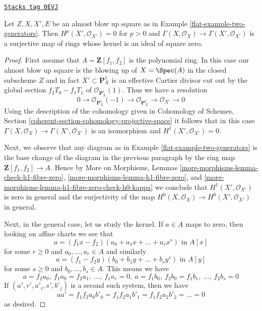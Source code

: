 \begin{lemma}
\label{flat-lemma-funny-blow-up}
\href{https://stacks.math.columbia.edu/tag/0EVJ}{\texttt{Stacks tag 0EVJ}}

Let $Z, X, X', E$ be an almost blow up square as in
Example \ref{flat-example-two-generators}.
Then $H^p(X', \mathcal{O}_{X'}) = 0$ for $p > 0$ and
$\Gamma(X, \mathcal{O}_X) \to \Gamma(X', \mathcal{O}_{X'})$
is a surjective map of rings whose kernel is an ideal of square zero.
\end{lemma}

\begin{proof}

First assume that $A = \mathbf{Z}[f_1, f_2]$ is the polynomial ring.
In this case our almost blow up square is the blowing up of $X = \Spec(A)$
in the closed subscheme $Z$ and in fact $X' \subset \mathbf{P}^1_X$
is an effective Cartier divisor cut out by the global section
$f_2T_0 - f_1 T_1$ of $\mathcal{O}_{\mathbf{P}^1_X}(1)$.
Thus we have a resolution
$$
0 \to
\mathcal{O}_{\mathbf{P}^1_X}(-1) \to
\mathcal{O}_{\mathbf{P}^1_X} \to
\mathcal{O}_{X'} \to
0
$$
Using the description of the cohomology given in
Cohomology of Schemes, Section
\ref{coherent-section-cohomology-projective-space}
it follows that in this case
$\Gamma(X, \mathcal{O}_X) \to \Gamma(X', \mathcal{O}_{X'})$
is an isomorphism and $H^1(X', \mathcal{O}_{X'}) = 0$.

\medskip\noindent
Next, we observe that any diagram as in Example \ref{flat-example-two-generators}
is the base change of the diagram in the previous paragraph by the
ring map $\mathbf{Z}[f_1, f_2] \to A$. Hence by More on Morphisms, Lemmas
\ref{more-morphisms-lemma-check-h1-fibre-zero},
\ref{more-morphisms-lemma-h1-fibre-zero}, and
\ref{more-morphisms-lemma-h1-fibre-zero-check-h0-kappa}
we conclude that $H^1(X', \mathcal{O}_{X'})$ is zero in general
and the surjectivity of the map
$H^0(X, \mathcal{O}_X) \to H^0(X', \mathcal{O}_{X'})$ in general.

\medskip\noindent
Next, in the general case, let us study the kernel. If
$a \in A$ maps to zero, then looking on affine charts
we see that
$$
a = (f_1x - f_2)(a_0 + a_1x + \ldots + a_rx^r)\text{ in }A[x]
$$
for some $r \geq 0$ and $a_0, \ldots, a_r \in A$ and similarly
$$
a = (f_1 - f_2y)(b_0 + b_1y + \ldots + b_s y^s)\text{ in }A[y]
$$
for some $s \geq 0$ and $b_0, \ldots, b_s \in A$. This means we
have
$$
a = f_2 a_0,\ f_1 a_0 = f_2 a_1,\ \ldots,\ f_1 a_r = 0,
\ a = f_1 b_0,\ f_2 b_0 = f_1 b_1,\ \ldots,\ f_2 b_s = 0
$$
If $(a', r', a'_i, s', b'_j)$ is a second such system, then we have
$$
aa' = f_1f_2a_0b'_0 = f_1f_2a_1b'_1 = f_1f_2a_2b'_2 = \ldots = 0
$$
as desired.
\end{proof}

